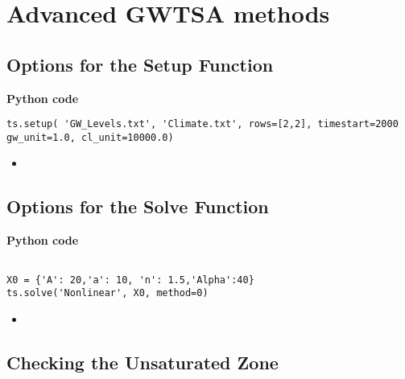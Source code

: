 \chapter{Advanced GWTSA methods}

\section{Options for the Setup Function}

\textbf{Python code}
\begin{lstlisting}
ts.setup( 'GW_Levels.txt', 'Climate.txt', rows=[2,2], timestart=2000 gw_unit=1.0, cl_unit=10000.0)
\end{lstlisting}

\begin{itemize}
	\item{}
\end{itemize}



\section{Options for the Solve Function}

\textbf{Python code}
\begin{lstlisting}

X0 = {'A': 20,'a': 10, 'n': 1.5,'Alpha':40}
ts.solve('Nonlinear', X0, method=0)

\end{lstlisting}

\begin{itemize}
	\item{}
\end{itemize}

\section{Checking the Unsaturated Zone}

